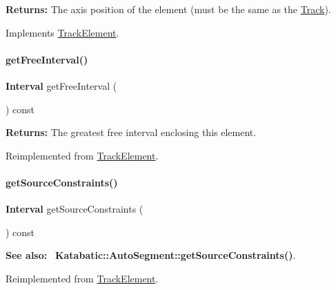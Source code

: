 {\bfseries Returns\+:} The axis position of the element (must be the same as the \mbox{\hyperlink{classKite_1_1Track}{Track}}). 

Implements \mbox{\hyperlink{classKite_1_1TrackElement_ac492fb5399691d81c31547db6b56fd03}{Track\+Element}}.

\mbox{\label{classKite_1_1TrackSegment_a034711e2d3617ea848ef9f5a18255e10}} 
\paragraph{\texorpdfstring{get\+Free\+Interval()}{getFreeInterval()}}
{\footnotesize\ttfamily \textbf{ Interval} get\+Free\+Interval (\begin{DoxyParamCaption}{ }\end{DoxyParamCaption}) const\hspace{0.3cm}{\ttfamily [virtual]}}

{\bfseries Returns\+:} The greatest free interval enclosing this element. 

Reimplemented from \mbox{\hyperlink{classKite_1_1TrackElement_a034711e2d3617ea848ef9f5a18255e10}{Track\+Element}}.

\mbox{\label{classKite_1_1TrackSegment_a48f8b54f9489da3778d85c382a483f81}} 
\paragraph{\texorpdfstring{get\+Source\+Constraints()}{getSourceConstraints()}}
{\footnotesize\ttfamily \textbf{ Interval} get\+Source\+Constraints (\begin{DoxyParamCaption}{ }\end{DoxyParamCaption}) const\hspace{0.3cm}{\ttfamily [virtual]}}

{\bfseries See also\+:}~ \textbf{ Katabatic\+::\+Auto\+Segment\+::get\+Source\+Constraints()}. 

Reimplemented from \mbox{\hyperlink{classKite_1_1TrackElement_a48f8b54f9489da3778d85c382a483f81}{Track\+Element}}.

